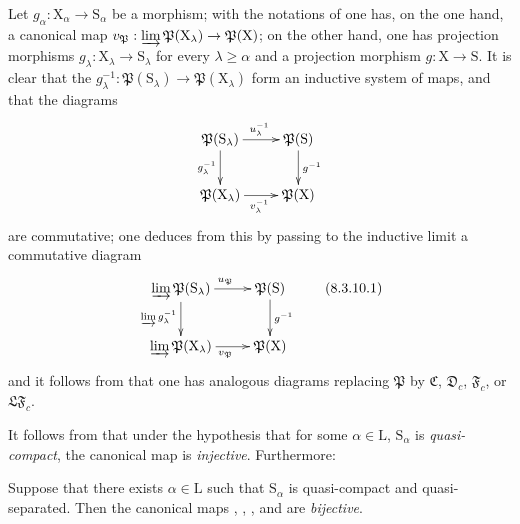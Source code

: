 \begin{env}[8.3.10]
\label{IV.8.3.10}
Let $g_\alpha:\mathrm{X}_\alpha\to\mathrm{S}_\alpha$ be a morphism; with the notations of  one has, on the one hand, a canonical map $v_\mathfrak{P}:\varinjlim\mathfrak{P}(\mathrm{X}_\lambda)\to\mathfrak{P}(\mathrm{X})$; on the other hand, one has projection morphisms $g_\lambda:\mathrm{X}_\lambda\to\mathrm{S}_\lambda$ for every $\lambda\geqslant\alpha$ and a projection morphism $g:\mathrm{X}\to\mathrm{S}$.
It is clear that the $g_\lambda^{-1}:\mathfrak{P}(\mathrm{S}_\lambda)\to\mathfrak{P}(\mathrm{X}_\lambda)$ form an inductive system of maps, and that the diagrams
\[
\xymatrix{
  \mathfrak{P}(\mathrm{S}_\lambda) \ar[r]^{u_\lambda^{-1}} \ar[d]_{g_\lambda^{-1}} & \mathfrak{P}(\mathrm{S}) \ar[d]^{g^{-1}} \\
  \mathfrak{P}(\mathrm{X}_\lambda) \ar[r]_{v_\lambda^{-1}} & \mathfrak{P}(\mathrm{X})
}
\]
are commutative; one deduces from this by passing to the inductive limit a commutative diagram
\begin{equation}
\xymatrix{
  \varinjlim\mathfrak{P}(\mathrm{S}_\lambda) \ar[r]^{u_\mathfrak{P}} \ar[d]_{\varinjlim g_\lambda^{-1}} & \mathfrak{P}(\mathrm{S}) \ar[d]^{g^{-1}} \\
  \varinjlim\mathfrak{P}(\mathrm{X}_\lambda) \ar[r]_{v_\mathfrak{P}} & \mathfrak{P}(\mathrm{X})
}
\tag{8.3.10.1}
\label{IV.8.3.10.1}
\end{equation}
and it follows from  that one has analogous diagrams replacing $\mathfrak{P}$ by $\mathfrak{C}$, $\mathfrak{D}_c$, $\mathfrak{F}_c$, or $\mathfrak{LF}_c$.
\end{env}

It follows from  that under the hypothesis that for some $\alpha\in\mathrm{L}$, $\mathrm{S}_\alpha$ is \emph{quasi-compact}, the canonical map  is \emph{injective}.
Furthermore:

\begin{theorem}[8.3.11]
\label{IV.8.3.11}
Suppose that there exists $\alpha\in\mathrm{L}$ such that $\mathrm{S}_\alpha$ is quasi-compact and quasi-separated.
Then the canonical maps , , , and  are \emph{bijective}.
\end{theorem}

